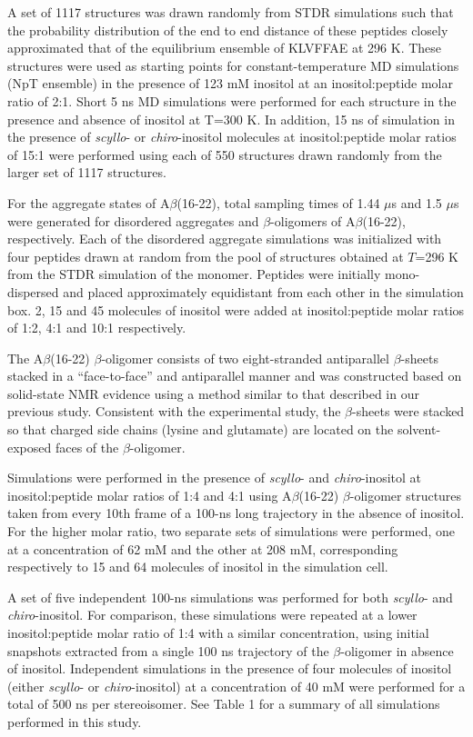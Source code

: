 A set of 1117 structures was drawn randomly from STDR simulations such that the probability distribution of the end to end distance of these peptides closely approximated that of the equilibrium ensemble of KLVFFAE at 296 K. These structures were used as starting points for constant-temperature MD simulations (NpT ensemble) in the presence of 123 mM inositol at an inositol:peptide molar ratio of 2:1. Short 5 ns MD simulations were performed for each structure in the presence and absence of inositol at T=300 K. In addition, 15 ns of simulation in the presence of  \emph{scyllo}- or  \emph{chiro}-inositol molecules at inositol:peptide molar ratios of 15:1 were performed using each of 550 structures drawn randomly from the larger set of 1117 structures.

For the aggregate states of A$\beta$(16-22), total sampling times of 1.44 $\mu$s and 1.5 $\mu$s were generated for disordered aggregates and $\beta$-oligomers of A$\beta$(16-22), respectively. Each of the disordered aggregate simulations was initialized with four peptides drawn at random from the pool of structures obtained at $T$=296 K from the STDR simulation of the monomer. Peptides were initially mono-dispersed and placed approximately equidistant from each other in the simulation box. 2, 15 and 45 molecules of inositol were added at inositol:peptide molar ratios of 1:2, 4:1 and 10:1 respectively.

The A$\beta$(16-22) $\beta$-oligomer consists of two eight-stranded antiparallel $\beta$-sheets stacked in a ``face-to-face'' and antiparallel manner and was constructed based on solid-state NMR evidence\cite{Balbach:2000p49} using a method similar to that described in our previous study.\cite{Li:2012p853} Consistent with the experimental study, the $\beta$-sheets were stacked so that charged side chains (lysine and glutamate) are located on the solvent-exposed faces of the $\beta$-oligomer. 

Simulations were performed in the presence of  \emph{scyllo}- and  \emph{chiro}-inositol at inositol:peptide molar ratios of 1:4 and 4:1 using A$\beta$(16-22) $\beta$-oligomer structures taken from every 10th frame of a 100-ns long trajectory in the absence of inositol. For the higher molar ratio, two separate sets of simulations were performed, one at a concentration of 62 mM and the other at 208 mM, corresponding respectively to 15 and 64 molecules of inositol in the simulation cell.

A set of five independent 100-ns simulations was performed for both  \emph{scyllo}- and  \emph{chiro}-inositol. For comparison, these simulations were repeated at a lower inositol:peptide molar ratio of 1:4 with a similar concentration, using initial snapshots extracted from a single 100 ns trajectory of the $\beta$-oligomer in absence of inositol. Independent simulations in the presence of four molecules of inositol (either  \emph{scyllo}- or  \emph{chiro}-inositol) at a concentration of 40 mM were performed for a total of 500 ns per stereoisomer. See Table 1 for a summary of all simulations performed in this study.

